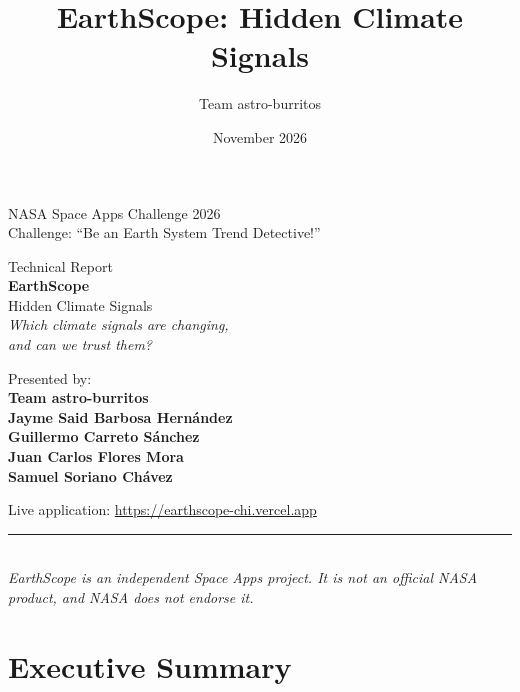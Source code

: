 \documentclass[12pt, oneside, openany]{report}
\title{EarthScope: Hidden Climate Signals}
\author{Team astro-burritos}
\date{November 2026}
\begin{document}
\pagestyle{empty}

\begin{center}
    {\large\color{electricBlue} NASA Space Apps Challenge 2026}\\[4pt]
    {\normalsize Challenge: \enquote{Be an Earth System Trend Detective!}}

    \vspace*{2.2cm}
    {\large Technical Report}\\[0.6cm]
    {\Huge\bfseries\color{spaceBlue} EarthScope}\\[0.3cm]
    {\LARGE Hidden Climate Signals}\\[0.5cm]
    {\large\itshape Which climate signals are changing,\\ and can we trust them?}

    \vspace*{2.2cm}
    Presented by:\\[4pt]
    \textbf{Team astro-burritos}\\[6pt]
    \textbf{Jayme Said Barbosa Hernández}\\
    \textbf{Guillermo Carreto Sánchez}\\
    \textbf{Juan Carlos Flores Mora}\\
    \textbf{Samuel Soriano Chávez}

    \vspace*{1.6cm}
    Live application: \url{https://earthscope-chi.vercel.app}
\end{center}

\vfill
{}

\vspace{0.8cm}
\begin{center}
    \textcolor{rocketRed}{\rule{12cm}{0.8mm}}\\[4pt]
    \small\textit{EarthScope is an independent Space Apps project. It is not an official NASA product, and NASA does not endorse it.}
\end{center}
\justify

\clearpage
\setcounter{page}{1}
\pagestyle{plain}

\chapter*{Executive Summary}
\end{document}
